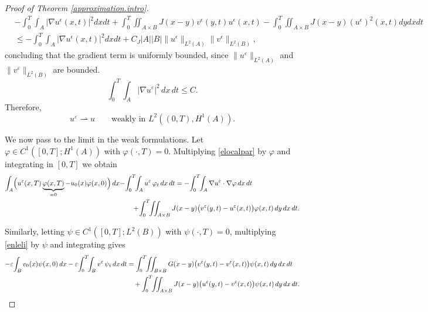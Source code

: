 \documentclass[reqno]{amsart}
\numberwithin{equation}{section}
\begin{document}
\begin{proof}[Proof of Theorem \ref{approximation.intro}]
\begin{align*}
    &-\int_{0}^{T}\int_A|\nabla u^\epsilon(x,t)|^2dxdt + \int_{0}^{T}\iint_{A\times B} J(x-y)v^\epsilon(y,t)u^\epsilon(x,t)-\int_{0}^{T}\iint_{A\times B} J(x-y)(u^\epsilon)^2(x,t)dydxdt\\
&\leq -\int_{0}^{T}\int_A|\nabla u^\epsilon(x,t)|^2dxdt +C_J|A||B|\|u^\epsilon\|_{L^2(A)}\|v^\epsilon\|_{L^2(B)},
\end{align*}
concluding that the gradient term is uniformly bounded, since $\|u^\varepsilon\|_{L^2(A)}$ and $\|v^\varepsilon\|_{L^2(B)}$ are bounded. 
$$\int_0^T\!\!\int_A |\nabla u^\varepsilon|^2\,dx\,dt\le C.$$
Therefore,
\begin{equation}\label{eH1weakconvp-e}
u^\varepsilon \rightharpoonup u
\qquad\text{weakly in } L^2 ((0,T),H^1(A)).
\end{equation}


We now pass to the limit in the weak formulations.  
Let $\varphi\in C^1([0,T];H^1(A))$ with $\varphi(\cdot,T)=0$.  
Multiplying \eqref{elocalpar} by $\varphi$ and integrating in $[0,T]$ we obtain
\begin{align}\label{elocalp-e}
\int_A\!\Big( u^\varepsilon(x,T)\underbrace{\varphi(x,T)}_{=0}
      -u_0(x)\varphi(x,0)\Big)\,dx
-&\!\int_0^T\!\!\int_A u^\varepsilon\,\varphi_t\,dx\,dt
=
-\!\int_0^T\!\!\int_A \nabla u^\varepsilon\cdot\nabla\varphi\,dx\,dt
\notag\\
&\quad
+\!\int_0^T\!\!\iint_{A\times B}
  J(x-y)\big( v^\varepsilon(y,t)-u^\varepsilon(x,t) \big)
  \varphi(x,t)\,dy\,dx\,dt.
\end{align}

Similarly, letting $\psi\in C^1([0,T];L^2(B))$ with $\psi(\cdot,T)=0$,
multiplying \eqref{enleli} by $\psi$ and integrating gives
\begin{align}\label{enlp-e}
-\varepsilon\!\int_B v_0(x)\psi(x,0)\,dx
-\varepsilon\!\int_0^T\!\!\int_B v^\varepsilon\,\psi_t\,dx\,dt
&=
\int_0^T\!\!\iint_{B\times B}
  G(x-y)\big( v^\varepsilon(y,t)-v^\varepsilon(x,t) \big)
  \psi(x,t)\,dy\,dx\,dt
\notag\\
&\quad
+\int_0^T\!\!\iint_{A\times B}
  J(x-y)\big( u^\varepsilon(y,t)-v^\varepsilon(x,t) \big)
  \psi(x,t)\,dy\,dx\,dt.
\end{align}


\end{proof}
\end{document}
